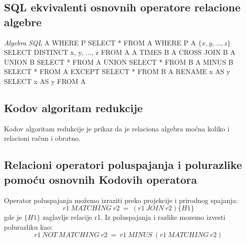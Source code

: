\documentclass{article}
\begin{document}
\subsection{SQL ekvivalenti osnovnih operatore relacione algebre}
\hspace*{1.8cm}\textit{Algebra} \hspace*{5cm} \textit{SQL}
\newline \hspace*{1cm}
A WHERE P \hspace*{3cm} SELECT * FROM A WHERE P
\newline \hspace*{1cm}
A $\{x, y, ... , z\}$ \hspace*{2.5cm} SELECT DISTINCT x, y, ..., z FROM A
\newline \hspace*{1cm}
A TIMES B \hspace*{4.5cm} A CROSS JOIN B
\newline \hspace*{1cm}
A UNION B \hspace*{1cm} SELECT * FROM A UNION SELECT * FROM B
\newline \hspace*{1cm}
A MINUS B \hspace*{0.8cm} SELECT * FROM A EXCEPT SELECT * FROM B
\newline \hspace*{1cm}
A RENAME x AS y \hspace*{2.5cm} SELECT x AS y FROM A

\subsection{Kodov algoritam redukcije}
Kodov algoritam redukcije je prikaz da je relaciona algebra moćna koliko 
i relacioni račun i obratno.

\subsection{Relacioni operatori poluspajanja i polurazlike pomoću osnovnih
Kodovih operatora}
Operator poluspajanja možemo izraziti preko projekcije i prirodnog spajanja:
\newline
$$r1\ MATCHING\ r2\ =\ (r1\ JOIN\ r2)\{H1\}$$
gde je $\{H1\}$ zaglavlje relacije r1.
\newline
Iz poluspajanja i razlike mozemo izvesti polurazliku kao:
$$r1\ NOT\ MATCHING\ r2\ =\ r1\ MINUS\ (r1\ MATCHING\ r2)$$
\end{document}
